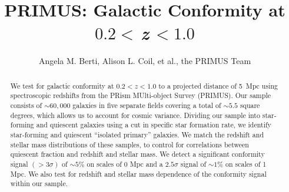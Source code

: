 \documentclass[apj,tighten,iop]{emulateapj2}
\begin{document}
\title{PRIMUS: Galactic Conformity at $0.2<\,$\MakeLowercase{\emph{z}}$\,<1.0$}

\author{Angela M. Berti,
	Alison L. Coil,
	et al.,
	the PRIMUS Team
}


\begin{abstract}
We test for galactic conformity at $0.2<z<1.0$ to a projected distance of 5~Mpc using spectroscopic redshifts from the PRism MUlti-object Survey (PRIMUS).
Our sample consists of $\sim60,000$ galaxies in five separate fields covering a total of $\sim5.5$ square degrees, which allows us to account for cosmic variance.
Dividing our sample into star-forming and quiescent galaxies using a cut in specific star formation rate, we identify star-forming and quiescent ``isolated primary'' galaxies.
We match the redshift and stellar mass distributions of these samples, to control for correlations between quiescent fraction and redshift and stellar mass.
We detect a significant conformity signal $(>3\sigma)$ of $\sim5$\% on scales of 0 Mpc and a $2.5\sigma$ signal of $\sim1$\% on scales of 1 Mpc.
We also test for redshift and stellar mass dependence of the conformity signal within our sample.
\end{abstract}












\end{document}
